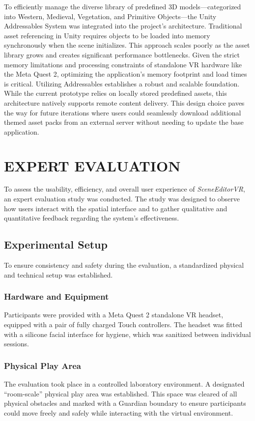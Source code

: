 \documentclass[inscr,ack,preface]{dithesis}
\begin{document}
To efficiently manage the diverse library of predefined 3D models—categorized into Western, Medieval, Vegetation,
and Primitive Objects—the Unity Addressables System was integrated into the project's architecture.
Traditional asset referencing in Unity requires objects to be loaded into memory synchronously when the scene initializes.
This approach scales poorly as the asset library grows and creates significant performance bottlenecks.
Given the strict memory limitations and processing constraints of standalone VR hardware like the Meta Quest 2,
optimizing the application's memory footprint and load times is critical. Utilizing Addressables establishes a
robust and scalable foundation. While the current prototype relies on locally stored predefined assets, this architecture natively supports
remote content delivery. This design choice paves the way for future iterations where users could seamlessly download
additional themed asset packs from an external server without needing to update the base application.

\chapter{EXPERT EVALUATION}
To assess the usability, efficiency, and overall user experience of \textit{SceneEditorVR}, an expert evaluation study was conducted.
The study was designed to observe how users interact with the spatial interface and to gather qualitative and quantitative feedback regarding
the system's effectiveness.


\section{Experimental Setup}

To ensure consistency and safety during the evaluation, a standardized physical and technical setup was established.

\subsection{Hardware and Equipment}
Participants were provided with a Meta Quest 2 standalone VR headset, equipped with a pair of fully charged Touch controllers. The headset was fitted with a silicone facial interface for hygiene, which was sanitized between individual sessions.

\subsection{Physical Play Area}
The evaluation took place in a controlled laboratory environment.
A designated ``room-scale'' physical play area was established.
This space was cleared of all physical obstacles and marked with a Guardian boundary to ensure participants could move freely
and safely while interacting with the virtual environment.
\end{document}
